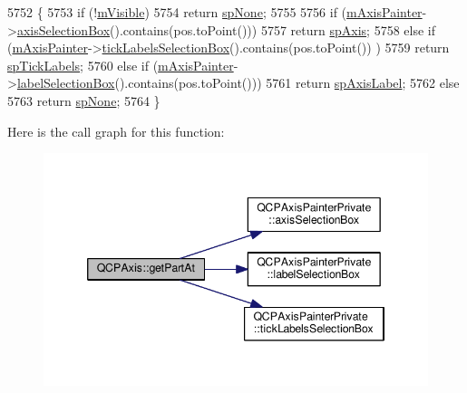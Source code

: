 \begin{DoxyCode}
5752                                                                  \{
5753   \textcolor{keywordflow}{if} (!\hyperlink{class_q_c_p_layerable_a62e3aed8427d6ce3ccf716f285106cb3}{mVisible})
5754     \textcolor{keywordflow}{return} \hyperlink{class_q_c_p_axis_abee4c7a54c468b1385dfce2c898b115fae0df8123a5528d5ccf87cb7794f971ea}{spNone};
5755 
5756   \textcolor{keywordflow}{if} (\hyperlink{class_q_c_p_axis_aeeae00935bd2dab82d64f32544a90913}{mAxisPainter}->\hyperlink{class_q_c_p_axis_painter_private_aaf93529ac60215ea020cdff5635c3e80}{axisSelectionBox}().contains(pos.toPoint()))
5757     \textcolor{keywordflow}{return} \hyperlink{class_q_c_p_axis_abee4c7a54c468b1385dfce2c898b115fa8949d2c1a31eccae9be7ed32e7a1ae38}{spAxis};
5758   \textcolor{keywordflow}{else} \textcolor{keywordflow}{if} (\hyperlink{class_q_c_p_axis_aeeae00935bd2dab82d64f32544a90913}{mAxisPainter}->\hyperlink{class_q_c_p_axis_painter_private_af02fc189ab8460c202eb4138c9aca516}{tickLabelsSelectionBox}().contains(pos.toPoint())
      )
5759     \textcolor{keywordflow}{return} \hyperlink{class_q_c_p_axis_abee4c7a54c468b1385dfce2c898b115fa584e0a3dc4d064880647619f4bd4e771}{spTickLabels};
5760   \textcolor{keywordflow}{else} \textcolor{keywordflow}{if} (\hyperlink{class_q_c_p_axis_aeeae00935bd2dab82d64f32544a90913}{mAxisPainter}->\hyperlink{class_q_c_p_axis_painter_private_ae907476bf8cf0ecd17620575e17c06b1}{labelSelectionBox}().contains(pos.toPoint()))
5761     \textcolor{keywordflow}{return} \hyperlink{class_q_c_p_axis_abee4c7a54c468b1385dfce2c898b115fa851e0600e0d08b4f5fee9361e3fedabd}{spAxisLabel};
5762   \textcolor{keywordflow}{else}
5763     \textcolor{keywordflow}{return} \hyperlink{class_q_c_p_axis_abee4c7a54c468b1385dfce2c898b115fae0df8123a5528d5ccf87cb7794f971ea}{spNone};
5764 \}
\end{DoxyCode}


Here is the call graph for this function\+:\nopagebreak
\begin{figure}[H]
\begin{center}
\leavevmode
\includegraphics[width=346pt]{class_q_c_p_axis_ab2965a8ab1da948b897f1c006080760b_cgraph}
\end{center}
\end{figure}





